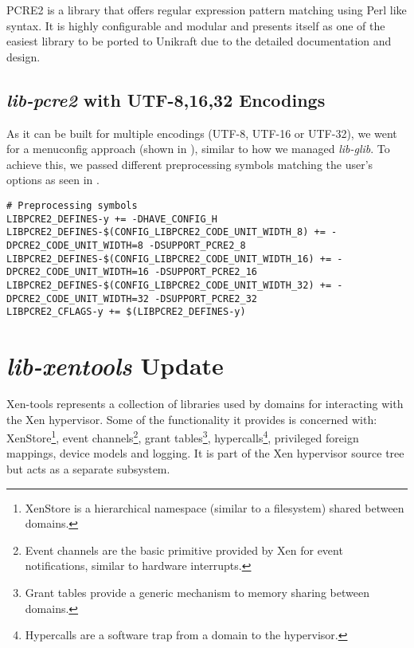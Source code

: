 PCRE2 \cite{pcre2} is a library that offers regular expression pattern matching using Perl like syntax.
It is highly configurable and modular and presents itself as one of the easiest library to be ported to Unikraft due to the detailed documentation and design.

\subsection{\textit{lib-pcre2} with UTF-8,16,32 Encodings}
\label{subsec:pcre2-menuconfig}

As it can be built for multiple encodings (UTF-8, UTF-16 or UTF-32), we went for a menuconfig approach (shown in ), similar to how we managed \textit{lib-glib}.
To achieve this, we passed different preprocessing symbols matching the user's options as seen in .


\begin{lstlisting}
# Preprocessing symbols
LIBPCRE2_DEFINES-y += -DHAVE_CONFIG_H
LIBPCRE2_DEFINES-$(CONFIG_LIBPCRE2_CODE_UNIT_WIDTH_8) += -DPCRE2_CODE_UNIT_WIDTH=8 -DSUPPORT_PCRE2_8
LIBPCRE2_DEFINES-$(CONFIG_LIBPCRE2_CODE_UNIT_WIDTH_16) += -DPCRE2_CODE_UNIT_WIDTH=16 -DSUPPORT_PCRE2_16
LIBPCRE2_DEFINES-$(CONFIG_LIBPCRE2_CODE_UNIT_WIDTH_32) += -DPCRE2_CODE_UNIT_WIDTH=32 -DSUPPORT_PCRE2_32
LIBPCRE2_CFLAGS-y += $(LIBPCRE2_DEFINES-y)
\end{lstlisting}

\section{\textit{lib-xentools} Update}
\label{sec:lib-xentools-update}

Xen-tools \cite{xen-tools} represents a collection of libraries used by domains for interacting with the Xen hypervisor.
Some of the functionality it provides is concerned with: XenStore\footnote{XenStore is a hierarchical namespace (similar to a filesystem) shared between domains.}, event channels\footnote{Event channels are the basic primitive provided by Xen for event notifications, similar to hardware interrupts.}, grant tables\footnote{Grant tables provide a generic mechanism to memory sharing between domains.}, hypercalls\footnote{Hypercalls are a software trap from a domain to the hypervisor.}, privileged foreign mappings, device models and logging.
It is part of the Xen hypervisor source tree \cite{xen-source-tree} but acts as a separate subsystem.

